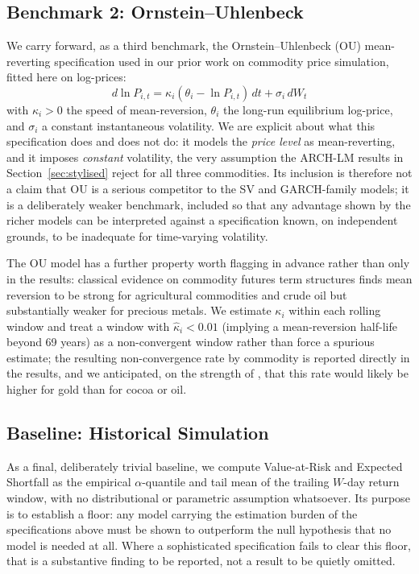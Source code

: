 \documentclass[preprint,12pt,authoryear]{elsarticle}
\begin{document}
\subsection{Benchmark 2: Ornstein--Uhlenbeck}
\label{sec:ou}

We carry forward, as a third benchmark, the Ornstein--Uhlenbeck (OU) mean-reverting specification used in our prior work on commodity price simulation, fitted here on log-prices:
\begin{equation}
  d\ln P_{i,t} = \kappa_i(\theta_i - \ln P_{i,t}) \, dt + \sigma_i \, dW_t
  \label{eq:ou}
\end{equation}
with $\kappa_i > 0$ the speed of mean-reversion, $\theta_i$ the long-run equilibrium log-price, and $\sigma_i$ a constant instantaneous volatility. We are explicit about what this specification does and does not do: it models the \emph{price level} as mean-reverting, and it imposes \emph{constant} volatility, the very assumption the ARCH-LM results in Section~\ref{sec:stylised} reject for all three commodities. Its inclusion is therefore not a claim that OU is a serious competitor to the SV and GARCH-family models; it is a deliberately weaker benchmark, included so that any advantage shown by the richer models can be interpreted against a specification known, on independent grounds, to be inadequate for time-varying volatility.

The OU model has a further property worth flagging in advance rather than only in the results: classical evidence on commodity futures term structures \citep{bessembinderetal1995} finds mean reversion to be strong for agricultural commodities and crude oil but substantially weaker for precious metals. We estimate $\kappa_i$ within each rolling window and treat a window with $\hat{\kappa}_i < 0.01$ (implying a mean-reversion half-life beyond 69 years) as a non-convergent window rather than force a spurious estimate; the resulting non-convergence rate by commodity is reported directly in the results, and we anticipated, on the strength of \citet{bessembinderetal1995}, that this rate would likely be higher for gold than for cocoa or oil.

\subsection{Baseline: Historical Simulation}

As a final, deliberately trivial baseline, we compute Value-at-Risk and Expected Shortfall as the empirical $\alpha$-quantile and tail mean of the trailing $W$-day return window, with no distributional or parametric assumption whatsoever. Its purpose is to establish a floor: any model carrying the estimation burden of the specifications above must be shown to outperform the null hypothesis that no model is needed at all. Where a sophisticated specification fails to clear this floor, that is a substantive finding to be reported, not a result to be quietly omitted.
\end{document}

